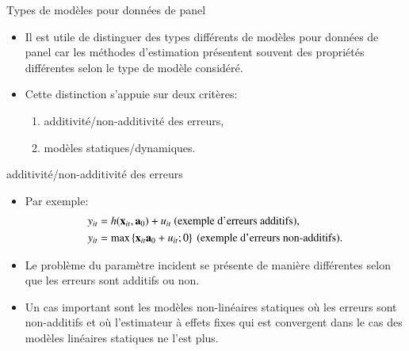 \begin{frame}[allowframebreaks]{Types de modèles pour données de panel}
\begin{itemize} 
    \item Il est  utile de distinguer des types différents de modèles pour données de panel car 
    les méthodes d'estimation présentent souvent des propriétés différentes selon le type de modèle considéré.  
    \item Cette distinction s'appuie sur deux critères:
    \begin{enumerate}
        \item additivité/non-additivité des erreurs,
        \item modèles statiques/dynamiques.
    \end{enumerate}
\end{itemize}
\end{frame}
\begin{frame}[allowframebreaks]{additivité/non-additivité des erreurs}
        \begin{itemize}
            \item Par exemple:
            \begin{align*}
                y_{it}&= h(\bold\boldx_{it}, \bolda_0) + u_{it} \ (\text{exemple d'erreurs additifs}),\\
                y_{it}&=\max\left\{ \bold\boldx_{it}\bolda_0 + u_{it}; 0\right\} \ (\text{exemple d'erreurs non-additifs}).
            \end{align*}
            \item Le problème du paramètre incident se présente de manière différentes
             selon que les erreurs sont additifs ou non.
             \item Un cas important sont les modèles non-linéaires statiques où 
             les erreurs sont non-additifs et où l'estimateur à effets 
             fixes qui est convergent dans le cas des modèles linéaires statiques ne l'est plus.
        \end{itemize}
    \end{frame}

